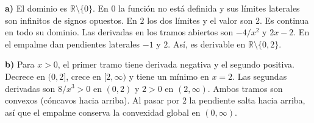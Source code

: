\textbf{a)} El dominio es $\mathbb R\setminus\{0\}$.
En $0$ la función no está definida y sus límites laterales
son infinitos de signos opuestos. En $2$ los dos límites y
el valor son $2$. Es continua en todo su dominio.
Las derivadas en los tramos abiertos son $-4/x^2$ y $2x-2$.
En el empalme dan pendientes laterales $-1$ y $2$.
Así, es derivable en $\mathbb R\setminus\{0,2\}$.

\textbf{b)} Para $x>0$, el primer tramo tiene derivada negativa
y el segundo positiva. Decrece en $(0,2]$, crece en $[2,\infty)$
y tiene un mínimo en $x=2$. Las segundas derivadas son $8/x^3>0$
en $(0,2)$ y $2>0$ en $(2,\infty)$. Ambos tramos son convexos
(cóncavos hacia arriba). Al pasar por $2$ la pendiente salta
hacia arriba, así que el empalme conserva la convexidad global
en $(0,\infty)$.
